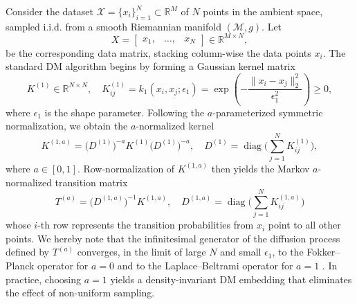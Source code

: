 \documentclass{article}
\begin{document}
Consider the dataset $\mathcal{X}=\{ x_i\}_{i=1}^N\subset\mathbb{R}^M$ of $N$ points in the ambient space, sampled i.i.d. from a smooth Riemannian manifold $(\mathcal{M},g)$. Let
\begin{equation}
    X = \begin{bmatrix} x_1, & \ldots, & x_N \end{bmatrix} \in\mathbb{R}^{M \times N},
\end{equation}
be the corresponding data matrix, stacking column-wise the data points $x_i$. The standard DM algorithm \cite{coifman2005geometric,coifman2006diffusion} begins by forming a Gaussian kernel matrix 
\begin{equation}
K^{(1)} \in \mathbb{R}^{N \times N}, \quad K_{ij}^{(1)} = k_1(x_i, x_j;\epsilon_1) = \operatorname{exp}\left(-\dfrac{\lVert x_i-x_j\rVert_2^2}{\epsilon_1^2}\right) \ge 0,
\end{equation}
where $\epsilon_1$ is the shape parameter. Following the $a$-parameterized symmetric normalization, we obtain the $a$-normalized kernel
\begin{equation}
    K^{(1,a)} = \big(D^{(1)}\big)^{-a} K^{(1)} \big(D^{(1)}\big)^{-a}, \quad
    D^{(1)} = \operatorname{diag}\Big(\sum_{j=1}^N K_{ij}^{(1)}\Big), 
\end{equation}
where $a\in[0,1]$. Row-normalization of $K^{(1,a)}$ then yields the Markov $a$-normalized transition matrix
\begin{equation}
T^{(a)}= \big(D^{(1,a)}\big)^{-1} K^{(1,a)}, \quad 
D^{(1,a)} = \operatorname{diag}\Big(\sum_{j=1}^N K_{ij}^{(1,a)}\Big)
\label{eq:transitionmatrix}
\end{equation}
whose $i$-th row represents the transition probabilities from $x_i$ point to all other points. We hereby note that the infinitesimal generator of the diffusion process defined by $T^{(a)}$ converges, in the limit of large $N$ and small $\epsilon_1$, to the Fokker–Planck operator for $a=0$ and to the Laplace–Beltrami operator for $a=1$ \cite{coifman2006diffusion}. In practice, choosing $a=1$ yields a density-invariant DM embedding that eliminates the effect of non-uniform sampling.%
\end{document}
